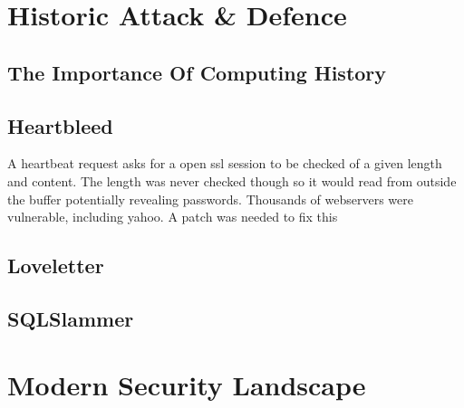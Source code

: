 



\chapter{Historic Attack \& Defence}
\section{The Importance Of Computing History}
\section{Heartbleed}
A heartbeat request asks for a open ssl session to be checked of a given length and content. The length was never checked though so it would read from outside the buffer potentially revealing passwords. Thousands of webservers were vulnerable, including yahoo. A patch was needed to fix this

\section{Loveletter}

\section{SQLSlammer}


\chapter{Modern Security Landscape}
